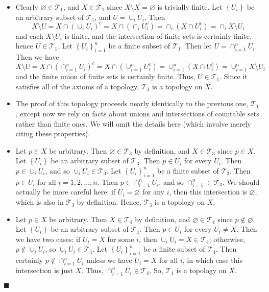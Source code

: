 \documentclass[12pt]{article}
\renewcommand{\qed}{\hfill$\blacksquare$}
\renewenvironment{proof}{\begin{addmargin}[1em]{0em}\begin{newproof}}{\end{newproof}\end{addmargin}\qed}
\begin{document}
\begin{proof}
\begin{itemize}
	\item Clearly $\varnothing \in \mathcal{T}_1$, and $X\in \mathcal{T}_1$ since $X\setminus X = \varnothing$ is trivially finite. Let $\left\{U_i\right\}$ be an arbitrary subset of $\mathcal{T}_1$, and $U = \cup_{i}U_i$. Then $$ X\setminus U = X\cap \left(\cup_i U_i\right)^c = X\cap \left(\cap_i U_i^c\right) = \cap_i \left(X\cap U_i^c\right) = \cap_i X\setminus U_i $$ and each $X\setminus U_i$ is finite, and the intersection of finite sets is certainly finite, hence $U \in \mathcal{T}_1$. Let  $\left\{U_i\right\}_{i=1}^n$ be a finite subset of $\mathcal{T}_1$. Then let $U = \cap_{i=1}^n U_i$. Then we have $$ X\setminus U = X\cap \left(\cap_{i=1}^n U_i\right)^c = X\cap \left(\cup_{i=1}^n U_i^c\right) = \cup_{i=1}^n \left(X\cap U_i^c\right) = \cup_{i=1}^n X\setminus U_i $$ and the finite union of finite sets is certainly finite. Thus, $U \in \mathcal{T}_1$. Since it satisfies all of the axioms of a topology, $\mathcal{T}_1$ is a topology on $X$.

	\item The proof of this topology proceeds nearly identically to the previous one, $\mathcal{T}_1$, except now we rely on facts about unions and intersections of countable sets rather than finite ones. We will omit the details here (which involve merely citing these properties).

	\item Let $p\in X$ be arbitrary. Then $\varnothing \in \mathcal{T}_3$ by definition, and $X\in \mathcal{T}_3$ since $p\in X$. Let $\left\{U_i\right\}$ be an arbitrary subset of $\mathcal{T}_3$. Then $p\in U_i$ for every $U_i$. Then $p \in \cup_i U_i$, and so $\cup_i U_i \in \mathcal{T}_3$. Let $\left\{U_i\right\}_{i=1}^n$ be a finite subset of $\mathcal{T}_3$. Then $p\in U_i$ for all $i=1,2,\ldots,n$. Then $p\in \cap_{i=1}^n U_i$, and so $\cap_{i=1}^n \in \mathcal{T}_3$. We should actually be more careful here: if $U_i = \varnothing$ for any $i$, then this intersection is $\varnothing$, which is also in $\mathcal{T}_3$ by definition. Hence, $\mathcal{T}_3$ is a topology on $X$.

	\item Let $p \in X$ be arbitrary. Then $X \in \mathcal{T}_4$ by definition, and $\varnothing \in \mathcal{T}_4$ since $p\notin \varnothing$. Let $\left\{U_i\right\}$ be an arbitrary subset of $\mathcal{T}_4$. Then $p\in U_i$ for every $U_i \neq X$. Then we have two cases: if $U_i = X$ for some $i$, then $\cup_i U_i = X \in \mathcal{T}_4$; otherwise, $p \notin \cup_i U_i$, so $\cup_i U_i \in \mathcal{T}_4$. Let $\left\{U_i\right\}_{i=1}^n$ be a finite subset of $\mathcal{T}_4$. Then certainly $p\notin \cap_{i=1}^n U_i$ unless we have $U_i=X$ for all $i$, in which case this intersection is just $X$. Thus, $\cap_{i=1}^n U_i \in \mathcal{T}_4$. So, $\mathcal{T}_4$ is a topology on $X$.


\end{itemize}
\end{proof}
\end{document}

